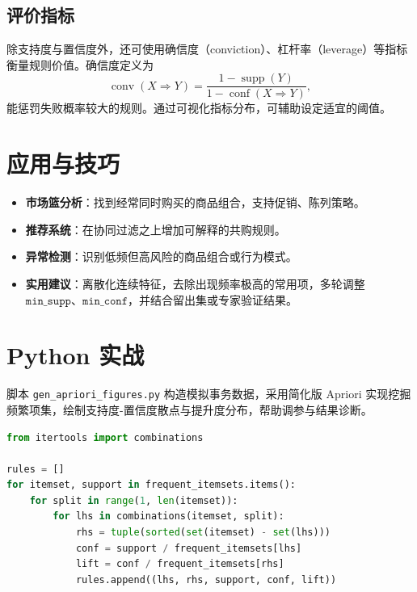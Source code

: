 \documentclass[UTF8,zihao=-4]{ctexart}
\begin{document}
\subsection{评价指标}
除支持度与置信度外，还可使用确信度（conviction）、杠杆率（leverage）等指标衡量规则价值。确信度定义为
\begin{equation}
\operatorname{conv}(X \Rightarrow Y) = \frac{1 - \operatorname{supp}(Y)}{1 - \operatorname{conf}(X \Rightarrow Y)},
\end{equation}
能惩罚失败概率较大的规则。通过可视化指标分布，可辅助设定适宜的阈值。

\section{应用与技巧}
\begin{itemize}
  \item \textbf{市场篮分析}：找到经常同时购买的商品组合，支持促销、陈列策略。
  \item \textbf{推荐系统}：在协同过滤之上增加可解释的共购规则。
  \item \textbf{异常检测}：识别低频但高风险的商品组合或行为模式。
  \item \textbf{实用建议}：离散化连续特征，去除出现频率极高的常用项，多轮调整 \(\texttt{min\_supp}\)、\(\texttt{min\_conf}\)，并结合留出集或专家验证结果。
\end{itemize}

\section{Python 实战}
脚本 \texttt{gen\_apriori\_figures.py} 构造模拟事务数据，采用简化版 Apriori 实现挖掘频繁项集，绘制支持度-置信度散点与提升度分布，帮助调参与结果诊断。
\begin{lstlisting}[language=Python,caption={脚本 gen_apriori_figures.py 片段}]
from itertools import combinations

rules = []
for itemset, support in frequent_itemsets.items():
    for split in range(1, len(itemset)):
        for lhs in combinations(itemset, split):
            rhs = tuple(sorted(set(itemset) - set(lhs)))
            conf = support / frequent_itemsets[lhs]
            lift = conf / frequent_itemsets[rhs]
            rules.append((lhs, rhs, support, conf, lift))
\end{lstlisting}
\end{document}
